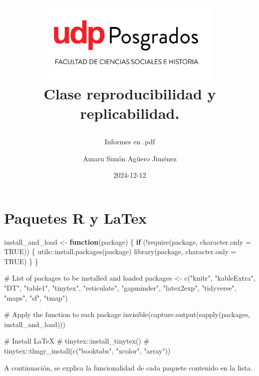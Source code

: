 \documentclass[
  10pt,
]{article}
\title{\begin{center}
  \includegraphics[height=4cm]{logo.png} \\[1cm]
  \Large Clase reproducibilidad y replicabilidad. \\
\end{center}}
\subtitle{Informes en .pdf}
\author{Amaru Simón Agüero Jiménez}
\date{2024-12-12}
\newenvironment{Shaded}{\begin{snugshade}}{\end{snugshade}}
\newcommand{\AttributeTok}[1]{\textcolor[rgb]{0.40,0.45,0.13}{#1}}
\newcommand{\CommentTok}[1]{\textcolor[rgb]{0.37,0.37,0.37}{#1}}
\newcommand{\ConstantTok}[1]{\textcolor[rgb]{0.56,0.35,0.01}{#1}}
\newcommand{\ControlFlowTok}[1]{\textcolor[rgb]{0.00,0.23,0.31}{\textbf{#1}}}
\newcommand{\FunctionTok}[1]{\textcolor[rgb]{0.28,0.35,0.67}{#1}}
\newcommand{\NormalTok}[1]{\textcolor[rgb]{0.00,0.23,0.31}{#1}}
\newcommand{\OtherTok}[1]{\textcolor[rgb]{0.00,0.23,0.31}{#1}}
\newcommand{\SpecialCharTok}[1]{\textcolor[rgb]{0.37,0.37,0.37}{#1}}
\newcommand{\StringTok}[1]{\textcolor[rgb]{0.13,0.47,0.30}{#1}}
\renewcommand*\contentsname{Tabla de contenidos}
\newcommand\contentsname{Tabla de contenidos}
\begin{document}
\maketitle

\renewcommand*\contentsname{Tabla de contenidos}
{
\hypersetup{linkcolor=}
\setcounter{tocdepth}{3}
\tableofcontents
}

\section{Paquetes R y LaTex}\label{paquetes-r-y-latex}

\begin{Shaded}
\begin{Highlighting}[]
\NormalTok{install\_and\_load }\OtherTok{\textless{}{-}} \ControlFlowTok{function}\NormalTok{(package) \{}
  \ControlFlowTok{if}\NormalTok{ (}\SpecialCharTok{!}\FunctionTok{require}\NormalTok{(package, }\AttributeTok{character.only =} \ConstantTok{TRUE}\NormalTok{)) \{}
\NormalTok{    utils}\SpecialCharTok{::}\FunctionTok{install.packages}\NormalTok{(package)}
    \FunctionTok{library}\NormalTok{(package, }\AttributeTok{character.only =} \ConstantTok{TRUE}\NormalTok{)}
\NormalTok{  \}}
\NormalTok{\}}

\CommentTok{\# List of packages to be installed and loaded}
\NormalTok{packages }\OtherTok{\textless{}{-}} \FunctionTok{c}\NormalTok{(}\StringTok{"knitr"}\NormalTok{,}
              \StringTok{"kableExtra"}\NormalTok{, }
              \StringTok{"DT"}\NormalTok{, }
              \StringTok{"table1"}\NormalTok{,}
              \StringTok{"tinytex"}\NormalTok{,}
              \StringTok{"reticulate"}\NormalTok{,}
              \StringTok{"gapminder"}\NormalTok{,}
              \StringTok{"latex2exp"}\NormalTok{,}
              \StringTok{"tidyverse"}\NormalTok{, }
              \StringTok{"maps"}\NormalTok{, }
              \StringTok{"sf"}\NormalTok{, }
              \StringTok{"tmap"}\NormalTok{)}

\CommentTok{\# Apply the function to each package}
\FunctionTok{invisible}\NormalTok{(}\FunctionTok{capture.output}\NormalTok{(}\FunctionTok{sapply}\NormalTok{(packages, install\_and\_load)))}

\CommentTok{\# Install LaTeX}
\CommentTok{\# tinytex::install\_tinytex()}
\CommentTok{\# tinytex::tlmgr\_install(c("booktabs", "xcolor", "array"))}
\end{Highlighting}
\end{Shaded}

A continuación, se explica la funcionalidad de cada paquete contenido en
la lista.
\end{document}

